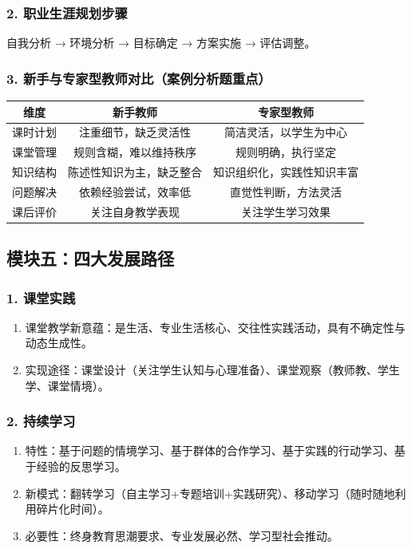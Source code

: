 \documentclass[12pt,a4paper]{article}
\begin{document}
\subsubsection{2. 职业生涯规划步骤}
自我分析 → 环境分析 → 目标确定 → 方案实施 → 评估调整。

\subsubsection{3. 新手与专家型教师对比（案例分析题重点）}
\begin{longtable}{|c|c|c|}
\hline
\textbf{维度} & \textbf{新手教师} & \textbf{专家型教师} \\
\hline
课时计划 & 注重细节，缺乏灵活性 & 简洁灵活，以学生为中心 \\
\hline
课堂管理 & 规则含糊，难以维持秩序 & 规则明确，执行坚定 \\
\hline
知识结构 & 陈述性知识为主，缺乏整合 & 知识组织化，实践性知识丰富 \\
\hline
问题解决 & 依赖经验尝试，效率低 & 直觉性判断，方法灵活 \\
\hline
课后评价 & 关注自身教学表现 & 关注学生学习效果 \\
\hline
\end{longtable}

\subsection{模块五：四大发展路径}
\subsubsection{1. 课堂实践}
\begin{enumerate}[label=•,itemsep=0.5ex]
\item 课堂教学新意蕴：是生活、专业生活核心、交往性实践活动，具有不确定性与动态生成性。
\item 实现途径：课堂设计（关注学生认知与心理准备）、课堂观察（教师教、学生学、课堂情境）。
\end{enumerate}

\subsubsection{2. 持续学习}
\begin{enumerate}[label=•,itemsep=0.5ex]
\item 特性：基于问题的情境学习、基于群体的合作学习、基于实践的行动学习、基于经验的反思学习。
\item 新模式：翻转学习（自主学习+专题培训+实践研究）、移动学习（随时随地利用碎片化时间）。
\item 必要性：终身教育思潮要求、专业发展必然、学习型社会推动。
\end{enumerate}
\end{document}
